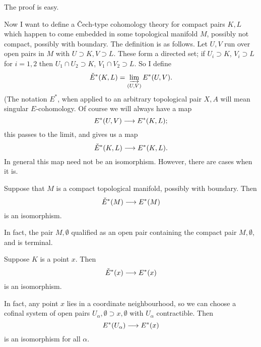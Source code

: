 \documentclass[../main]{subfiles}
\begin{document}
The proof is easy.

Now I want to define a \v{C}ech-type cohomology theory for compact pairs $K,L$ which happen to come embedded in some topological manifold $M$, possibly not compact, possibly with boundary. The definition is as follows. Let $U,V$ run over open pairs in $M$ with $U \supset K, V \supset L$. These form a directed set; if $U_i \supset K$, $V_i \supset L$ for $i=1,2$ then $U_1 \cap U_2 \supset K$, $V_1 \cap V_2 \supset L$. So I define
\[\check{E}^*(K,L) = \varinjlim_{(U,V)} E^*(U,V).\]
(The notation $E^*$, when applied to an arbitrary topological pair $X,A$ will mean singular $E$-cohomology. Of course we will always have a map 
\[E^*(U,V) \longrightarrow E^*(K,L);\]
this passes to the limit, and gives us a map
\[\check{E}^*(K,L) \longrightarrow E^*(K,L).\]
In general this map need not be an isomorphism. However, there are cases when it is.
\begin{examples}[i]
Suppose that $M$ is a compact topological manifold, possibly with boundary. Then 
\[\check{E}^*(M) \longrightarrow E^*(M)\]
is an isomorphism.
\end{examples}
In fact, the pair $M,\emptyset$ qualified as an open pair containing the compact pair $M,\emptyset$, and is terminal.
\begin{examples}[ii]
Suppose $K$ is a point $x$. Then 
\[\check{E}^*(x) \longrightarrow E^*(x)\]
is an isomorphism.
\end{examples}

In fact, any point $x$ lies in a coordinate neighbourhood, so we can choose a cofinal system of open pairs $U_\alpha, \emptyset \supset x, \emptyset$ with $U_\alpha$ contractible. Then 
\[E^*(U_\alpha) \longrightarrow E^*(x)\]
is an isomorphism for all $\alpha$.
\end{document}
